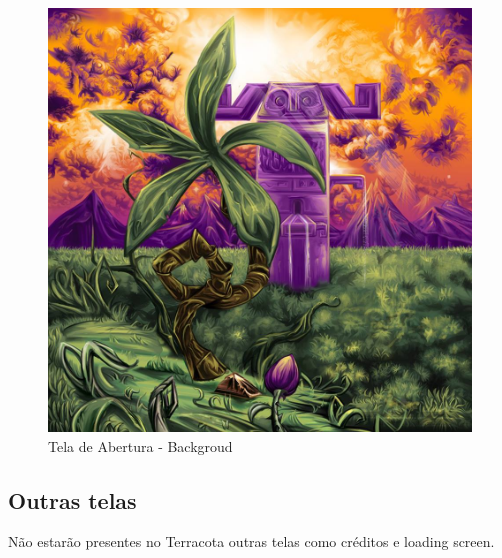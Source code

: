 \documentclass[12pt]{article}
\begin{document}
\begin{figure}[!htb]
    \centering
    \includegraphics[scale=0.4]{background_terracota.jpg}
    \caption{Tela de Abertura - Backgroud}
    \label{fig:background_terracota}
\end{figure}

\subsection{Outras telas}
Não estarão presentes no Terracota outras telas como créditos e loading screen.
\end{document}
